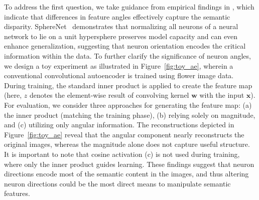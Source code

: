 \begin{itemize}[leftmargin=*,nosep]
To address the first question, we take guidance from empirical findings in \cite{liu2018decoupled,chen2020angular}, which indicate that differences in feature angles effectively capture the semantic disparity. SphereNet~\cite{liu2017deep} demonstrates that normalizing all neurons of a neural network to lie on a unit hypersphere preserves model capacity and can even enhance generalization, suggesting that neuron orientation encodes the critical information within the data. To further clarify the significance of neuron angles, we design a toy experiment as illustrated in Figure~\ref{fig:toy_ae}, wherein a conventional convolutional autoencoder is trained using flower image data. During training, the standard inner product is applied to create the feature map (here, $z$ denotes the element-wise result of convolving kernel $\bm{w}$ with the input $\bm{x}$). For evaluation, we consider three approaches for generating the feature map: (a) the inner product (matching the training phase), (b) relying solely on magnitude, and (c) utilizing only angular information. The reconstructions depicted in Figure~\ref{fig:toy_ae} reveal that the angular component nearly reconstructs the original images, whereas the magnitude alone does not capture useful structure. It is important to note that cosine activation (c) is not used during training, where only the inner product guides learning. These findings suggest that neuron directions encode most of the semantic content in the images, and thus altering neuron directions could be the most direct means to manipulate semantic features.


\end{itemize}
